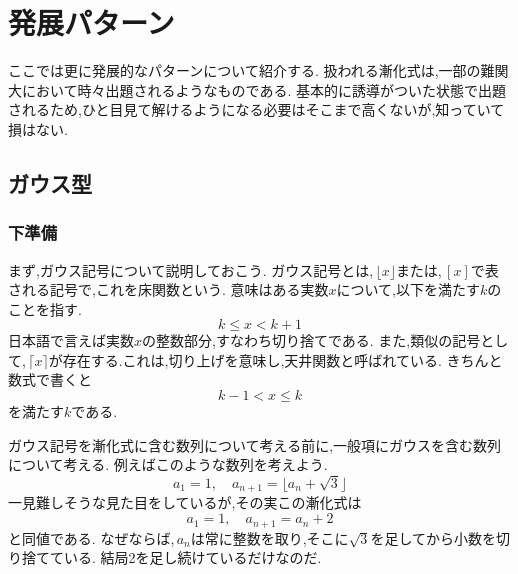 
\section{発展パターン}
ここでは更に発展的なパターンについて紹介する.
扱われる漸化式は,一部の難関大において時々出題されるようなものである.
基本的に誘導がついた状態で出題されるため,ひと目見て解けるようになる必要はそこまで高くないが,知っていて損はない.
\subsection{ガウス型}
\subsubsection{下準備}
まず,ガウス記号について説明しておこう.
ガウス記号とは,\,$\lfloor x \rfloor$または,\,$[x]$で表される記号で,これを床関数という.
意味はある実数$x$について,以下を満たす$k$のことを指す.
\[
  k \le x < k+1
\]
日本語で言えば実数$x$の整数部分,すなわち切り捨てである.
また,類似の記号として,\,$\lceil x \rceil$が存在する.これは,切り上げを意味し,天井関数と呼ばれている.
きちんと数式で書くと
\[
  k-1 < x \le k
\]
を満たす$k$である.

ガウス記号を漸化式に含む数列について考える前に,一般項にガウスを含む数列について考える.
例えばこのような数列を考えよう.
\[
  a_1=1,\quad a_{n+1}=\lfloor a_n+\sqrt{3} \rfloor
\]
一見難しそうな見た目をしているが,その実この漸化式は
\[
  a_1=1,\quad a_{n+1}=a_n+2
\]
と同値である.
なぜならば,\,$a_n$は常に整数を取り,そこに$\sqrt{3}$を足してから小数を切り捨てている.
結局2を足し続けているだけなのだ.

